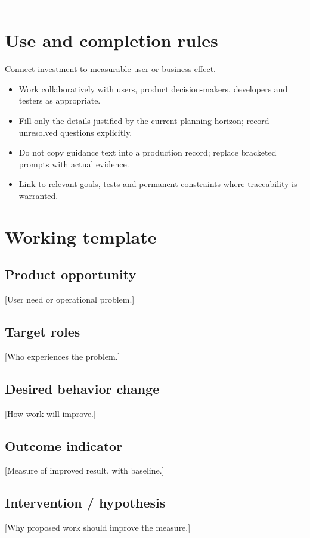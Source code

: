 \documentclass[11pt,letterpaper]{article}
\begin{document}
\tableofcontents\medskip\noindent\rule{\linewidth}{0.4pt}\medskip
\section{Use and completion rules}
Connect investment to measurable user or business effect.

\begin{itemize}[leftmargin=*,itemsep=2pt]
\item Work collaboratively with users, product decision-makers, developers and testers as appropriate.
\item Fill only the details justified by the current planning horizon; record unresolved questions explicitly.
\item Do not copy guidance text into a production record; replace bracketed prompts with actual evidence.
\item Link to relevant goals, tests and permanent constraints where traceability is warranted.
\end{itemize}
\section{Working template}
\subsection{Product opportunity}
[User need or operational problem.]

\subsection{Target roles}
[Who experiences the problem.]

\subsection{Desired behavior change}
[How work will improve.]

\subsection{Outcome indicator}
[Measure of improved result, with baseline.]

\subsection{Intervention / hypothesis}
[Why proposed work should improve the measure.]
\end{document}
